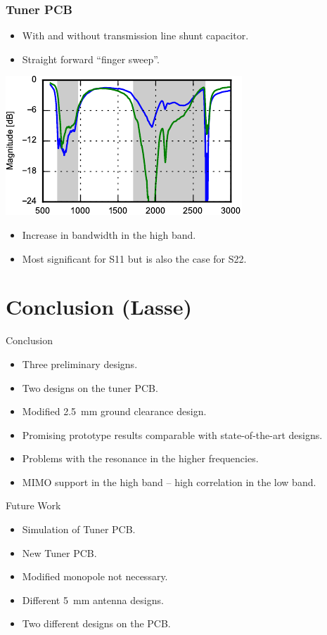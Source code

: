 \begin{frame}
  \frametitle{Tuner PCB}
  \begin{itemize}
  \item With and without transmission line shunt capacitor.
  \item Straight forward ``finger sweep''.
  \end{itemize}
\begin{center}
    \includegraphics[scale=1.4]{img/Lasse/tuner_pcb/003_s11top.pdf}
\end{center}
\begin{itemize}
\item Increase in bandwidth in the high band.
\item Most significant for S11 but is also the case for S22. 
\end{itemize}
\legendfooter
\end{frame}

\section[Conclusion]{Conclusion (Lasse)}
\begin{frame}
  \begin{block}{Conclusion}
    \begin{itemize}
    \item Three preliminary designs.
    \item Two designs on the tuner PCB.
    \item Modified \SI{2.5}{mm} ground clearance design.
    \item Promising prototype results comparable with state-of-the-art designs.
    \item Problems with the resonance in the higher frequencies.
    \item MIMO support in the high band -- high correlation in the low band.
    \end{itemize}
  \end{block}
  \begin{block}{Future Work}
    \begin{itemize}
    \item Simulation of Tuner PCB.
    \item New Tuner PCB.
    \item Modified monopole not necessary. 
    \item Different \SI{5}{mm} antenna designs.
    \item Two different designs on the PCB.
    \end{itemize}
  \end{block}
\end{frame}

